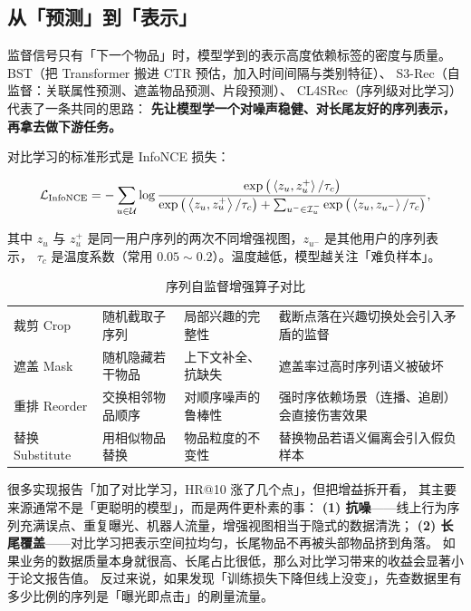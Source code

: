 \subsection{从「预测」到「表示」}

监督信号只有「下一个物品」时，模型学到的表示高度依赖标签的密度与质量。
BST（把 Transformer 搬进 CTR 预估，加入时间间隔与类别特征）、
S3-Rec（自监督：关联属性预测、遮盖物品预测、片段预测）、
CL4SRec（序列级对比学习）代表了一条共同的思路：
\textbf{先让模型学一个对噪声稳健、对长尾友好的序列表示，再拿去做下游任务。}

对比学习的标准形式是 InfoNCE 损失：

\begin{equation}
\mathcal{L}_{\text{InfoNCE}}
= - \sum_{u \in \mathcal{U}} \log
\frac{ \exp\big( \left\langle  z_u ,  z_u^{+}  \right\rangle / \tau_c \big) }
     { \exp\big( \left\langle  z_u ,  z_u^{+}  \right\rangle / \tau_c \big)
       + \sum_{u^{-} \in \mathcal{I}_u^{-}} \exp\big( \left\langle  z_u ,  z_{u^{-}}  \right\rangle / \tau_c \big) },
\label{eq:infonce}
\end{equation}

其中 $z_u$ 与 $z_u^{+}$ 是同一用户序列的两次不同增强视图，$z_{u^{-}}$ 是其他用户的序列表示，
$\tau_c$ 是温度系数（常用 $0.05 \sim 0.2$）。温度越低，模型越关注「难负样本」。

\begin{table}[htbp]
\centering
\caption{序列自监督增强算子对比}
\label{tab:selfsup-ops}
\small
\begin{tabularx}{\textwidth}{L{2.0cm} L{3.4cm} L{2.6cm} Y}
\toprule
{} &  &  &  \\
\midrule
裁剪 Crop & 随机截取子序列 & 局部兴趣的完整性 & 截断点落在兴趣切换处会引入矛盾的监督 \\
\addlinespace
遮盖 Mask & 随机隐藏若干物品 & 上下文补全、抗缺失 & 遮盖率过高时序列语义被破坏 \\
\addlinespace
重排 Reorder & 交换相邻物品顺序 & 对顺序噪声的鲁棒性 & 强时序依赖场景（连播、追剧）会直接伤害效果 \\
\addlinespace
替换 Substitute & 用相似物品替换 & 物品粒度的不变性 & 替换物品若语义偏离会引入假负样本 \\
\bottomrule
\end{tabularx}
\end{table}

\begin{insight}[对比学习的真实收益来源]
很多实现报告「加了对比学习，HR@10 涨了几个点」，但把增益拆开看，
其主要来源通常不是「更聪明的模型」，而是两件更朴素的事：
\textbf{(1) 抗噪}——线上行为序列充满误点、重复曝光、机器人流量，增强视图相当于隐式的数据清洗；
\textbf{(2) 长尾覆盖}——对比学习把表示空间拉均匀，长尾物品不再被头部物品挤到角落。
如果业务的数据质量本身就很高、长尾占比很低，那么对比学习带来的收益会显著小于论文报告值。
反过来说，如果发现「训练损失下降但线上没变」，先查数据里有多少比例的序列是「曝光即点击」的刷量流量。
\end{insight}

